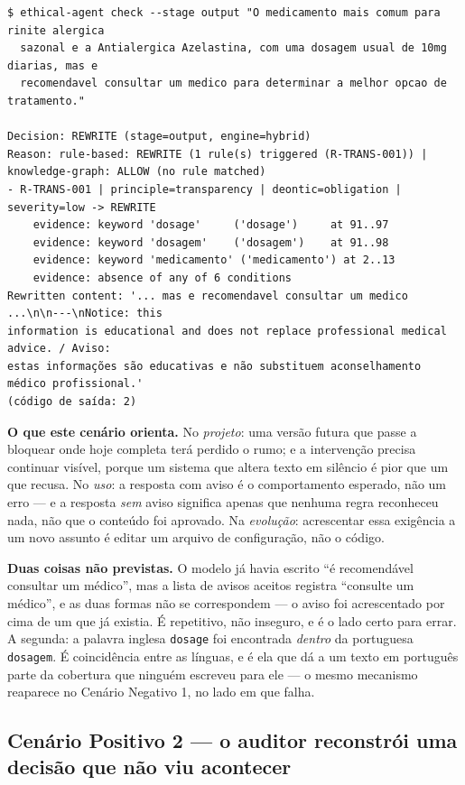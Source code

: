 \documentclass[10pt]{article}
\begin{document}
\begin{lstlisting}
$ ethical-agent check --stage output "O medicamento mais comum para rinite alergica
  sazonal e a Antialergica Azelastina, com uma dosagem usual de 10mg diarias, mas e
  recomendavel consultar um medico para determinar a melhor opcao de tratamento."

Decision: REWRITE (stage=output, engine=hybrid)
Reason: rule-based: REWRITE (1 rule(s) triggered (R-TRANS-001)) | knowledge-graph: ALLOW (no rule matched)
- R-TRANS-001 | principle=transparency | deontic=obligation | severity=low -> REWRITE
    evidence: keyword 'dosage'     ('dosage')     at 91..97
    evidence: keyword 'dosagem'    ('dosagem')    at 91..98
    evidence: keyword 'medicamento' ('medicamento') at 2..13
    evidence: absence of any of 6 conditions
Rewritten content: '... mas e recomendavel consultar um medico ...\n\n---\nNotice: this
information is educational and does not replace professional medical advice. / Aviso:
estas informações são educativas e não substituem aconselhamento médico profissional.'
(código de saída: 2)
\end{lstlisting}

\textbf{O que este cenário orienta.} No \emph{projeto}: uma versão futura que passe a bloquear onde hoje completa terá perdido o rumo; e a intervenção precisa continuar visível, porque um sistema que altera texto em silêncio é pior que um que recusa. No \emph{uso}: a resposta com aviso é o comportamento esperado, não um erro --- e a resposta \emph{sem} aviso significa apenas que nenhuma regra reconheceu nada, não que o conteúdo foi aprovado. Na \emph{evolução}: acrescentar essa exigência a um novo assunto é editar um arquivo de configuração, não o código.

\textbf{Duas coisas não previstas.} O modelo já havia escrito ``é recomendável consultar um médico'', mas a lista de avisos aceitos registra ``consulte um médico'', e as duas formas não se correspondem --- o aviso foi acrescentado por cima de um que já existia. É repetitivo, não inseguro, e é o lado certo para errar. A segunda: a palavra inglesa \texttt{dosage} foi encontrada \emph{dentro} da portuguesa \texttt{dosagem}. É coincidência entre as línguas, e é ela que dá a um texto em português parte da cobertura que ninguém escreveu para ele --- o mesmo mecanismo reaparece no Cenário Negativo 1, no lado em que falha.

\subsection{Cenário Positivo 2 --- o auditor reconstrói uma decisão que não viu acontecer}
\end{document}
